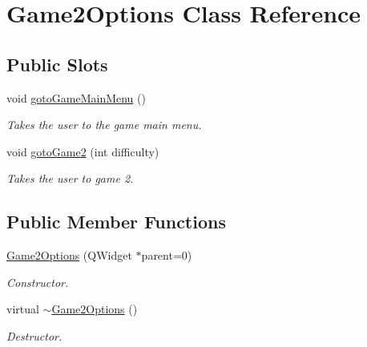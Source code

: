 \hypertarget{classGame2Options}{\section{\-Game2\-Options \-Class \-Reference}
\label{classGame2Options}
}
\subsection*{\-Public \-Slots}
\begin{DoxyCompactItemize}
\item 
void \hyperlink{classGame2Options_aaffb35f766f8ce4de6eb48ea858cbcc8}{goto\-Game\-Main\-Menu} ()
\begin{DoxyCompactList}\small\item\em \-Takes the user to the game main menu. \end{DoxyCompactList}\item 
void \hyperlink{classGame2Options_a2ec520a8e0c715e53653f4fa09fe41c8}{goto\-Game2} (int difficulty)
\begin{DoxyCompactList}\small\item\em \-Takes the user to game 2. \end{DoxyCompactList}\end{DoxyCompactItemize}
\subsection*{\-Public \-Member \-Functions}
\begin{DoxyCompactItemize}
\item 
\hyperlink{classGame2Options_a74d346b82341094cf8f40699256b2b99}{\-Game2\-Options} (\-Q\-Widget $\ast$parent=0)
\begin{DoxyCompactList}\small\item\em \-Constructor. \end{DoxyCompactList}\item 
virtual \hyperlink{classGame2Options_adaaa1fccbb182b7867beb767d13ba135}{$\sim$\-Game2\-Options} ()
\begin{DoxyCompactList}\small\item\em \-Destructor. \end{DoxyCompactList}\end{DoxyCompactItemize}


